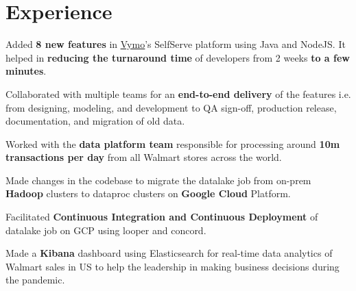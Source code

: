 \documentclass[]{deedy-resume-reversed}
\begin{document}
%
%

%
%

%
%

\begin{minipage}[t]{0.60\textwidth}


\section{Experience}
\vspace{\topsep} %
\begin{tightemize}
\item Added \textbf{8 new features} in \href{https://www.getvymo.com/}{\underline{Vymo}}'s SelfServe platform using Java and NodeJS. It helped in \textbf{reducing the turnaround time} of developers from 2 weeks \textbf{to a few minutes}.
\item Collaborated with multiple teams for an \textbf{end-to-end delivery} of the features i.e. from designing, modeling, and development to QA sign-off, production release, documentation, and migration of old data.
\end{tightemize}
\sectionsep

\begin{tightemize}
\item Worked with the \textbf{data platform team} responsible for processing around \textbf{10m transactions per day} from all Walmart stores across the world.
\item Made changes in the codebase to migrate the datalake job from on-prem \textbf{Hadoop} clusters to dataproc clusters on \textbf{Google Cloud} Platform.
\item Facilitated \textbf{Continuous Integration and Continuous Deployment} of datalake job on GCP using looper and concord.
\item Made a \textbf{Kibana} dashboard using Elasticsearch for real-time data analytics of Walmart sales in US to help the leadership in making business decisions during the pandemic.
\end{tightemize}
\sectionsep


\end{minipage}
\end{document}
